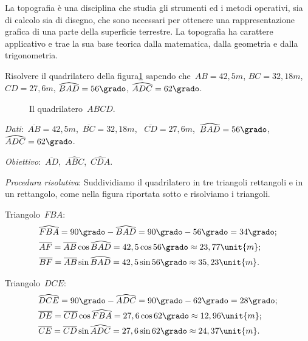 La topografia è una disciplina che studia gli strumenti ed i metodi 
operativi, 
sia di calcolo sia di disegno, che sono necessari per ottenere
una rappresentazione grafica di una parte della superficie terrestre.
La topografia ha carattere applicativo e trae la sua base teorica dalla 
matematica, dalla geometria e dalla trigonometria.

 \begin{esempio}
Risolvere il quadrilatero della figura\ref{fig:G.7} sapendo 
che~\(AB=42,5\unit{m}\), \(BC=32,18\unit{m}\), \(CD=27,6\unit{m}\),
\(\widehat{BAD}=56\grado\), \(\widehat{ADC}=62\grado\).
\begin{inaccessibleblock}
 \begin{figure}[t]
\centering

\caption{Il quadrilatero~\(ABCD\).}\label{fig:G.7}
\end{figure}
\end{inaccessibleblock}

\emph{Dati}:~\(\overline{AB}=42,5\unit{m}\),\quad~\(\overline{BC}=32,18\unit{m}\),
\quad~\(\overline{CD}=27,6\unit{m}\),\quad~\(\widehat{BAD}=56\grado\),
\quad~\(\widehat{ADC}=62\grado\).

\emph{Obiettivo}:~\(\overline{AD}\),\quad~\(\widehat{ABC}\),\quad~\(\widehat{CDA}\).

\emph{Procedura risolutiva}:
Suddividiamo il quadrilatero in tre triangoli rettangoli e in un rettangolo, 
come nella figura riportata sotto e risolviamo i triangoli.

Triangolo~\(FBA\):
\begin{align*}
&\widehat{FBA}=90\grado-\widehat{BAD}=90\grado-56\grado=34\grado;\\
&\overline{AF}=\overline{AB}\cos \widehat{BAD} = 42,5\cos 56\grado \approx23,
77\unit{m};\\
&\overline{BF}=\overline{AB}\sin \widehat{BAD} =42,5 \sin 56\grado\approx35,
23\unit{m}.
\end{align*}

Triangolo~\(DCE\):
\begin{align*}
 &\widehat{DCE}=90\grado-\widehat{ADC}=90\grado-62\grado=28\grado;\\
&\overline{DE}=\overline{CD}\cos \widehat{FBA}=27,6\cos 62\grado \approx12,
96\unit{m};\\
&\overline{CE}=\overline{CD}\sin \widehat{ADC} =27,6 \sin 62\grado \approx24,
37\unit{m}.
\end{align*}


\end{esempio}
